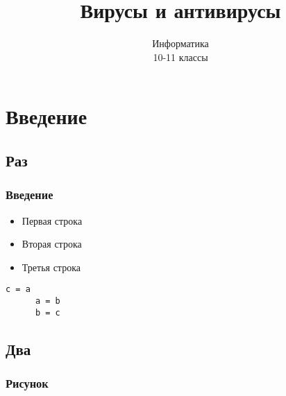 \documentclass[compress,red]{beamer}
\title{Вирусы и антивирусы}
\author{Информатика \\ 10-11 классы}
\begin{document}
\maketitle

\section{Введение}
\subsection{Раз}
\begin{frame}[fragile]
\frametitle{Введение}
		\begin{itemize}[<+->]
		\item Первая строка
		\item Вторая строка
		\item Третья строка
		\end{itemize}
    \begin{lstlisting}[label=ruby2_1,caption=Решение линейного уравнения]
      c = a
      a = b
      b = c
    \end{lstlisting}
\end{frame}

\subsection{Два}
\begin{frame}
  \frametitle{Рисунок}
\end{frame}
\end{document}

